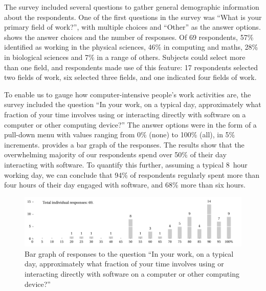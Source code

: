 \documentclass{casicswhitepaper}
\newcommand{\totalrespondents}{69\xspace}
\begin{document}
The survey included several questions to gather general demographic information about the respondents.  One of the first questions in the survey was ``What is your primary field of work?'', with multiple choices and ``Other'' as the answer options.   shows the answer choices and the number of responses.  Of \totalrespondents respondents, 57\% identified as working in the physical sciences, 46\% in computing and maths, 28\% in biological sciences and 7\% in a range of others.  Subjects could select more than one field, and respondents made use of this feature: 17 respondents selected two fields of work, six selected three fields, and one indicated four fields of work.

To enable us to gauge how computer-intensive people's work activities are, the survey included the question ``In your work, on a typical day, approximately what fraction of your time involves using or interacting directly with software on a computer or other computing device?''  The answer options were in the form of a pull-down menu with values ranging from 0\% (none) to 100\% (all), in 5\% increments.   provides a bar graph of the responses.  The results show that the overwhelming majority of our respondents spend over 50\% of their day interacting with software.  To quantify this further, assuming a typical 8~hour working day, we can conclude that 94\% of respondents regularly spent more than four hours of their day engaged with software, and 68\% more than six hours.

\begin{figure}[bht]
  \centering
  \includegraphics[trim=0.1in 0.1in 0 0,width=6.25in]{files/plots/bar-graph-time-spent-with-software.pdf}
  \caption{Bar graph of responses to the question ``In your work, on a
    typical day, approximately what fraction of your time involves using or
    interacting directly with software on a computer or other computing
    device?''}
  \label{time-with-software}
\end{figure}
\end{document}
